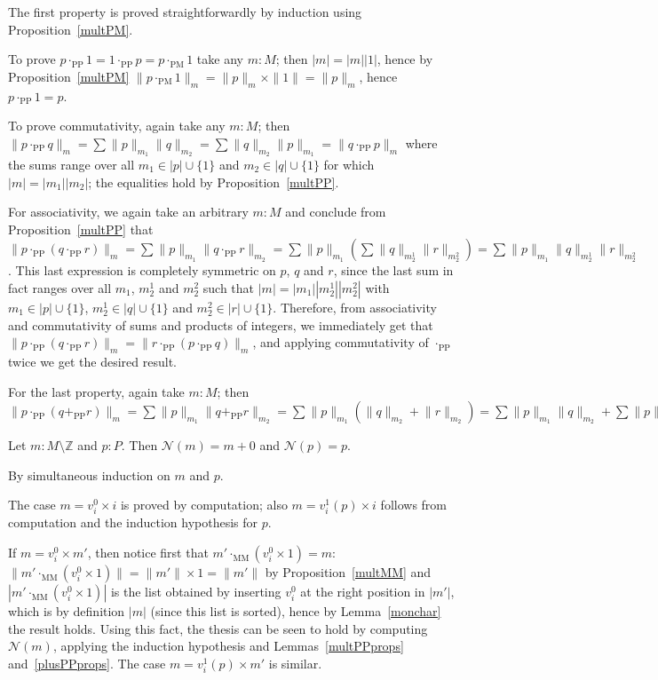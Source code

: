 \documentclass[numreferences]{kluwer}
\newcommand{\N}{\ensuremath{\mathcal{N}}}
\newcommand{\Z}{{\mathbb Z}}
\newcommand{\coeff}[2]{\ensuremath{\|#2\|_{#1}}}
\newcommand{\multMM}{\ensuremath{\cdot_{\mathrm{MM}}}}
\newcommand{\plusPP}{\ensuremath{+_{\mathrm{PP}}}}
\newcommand{\multPM}{\ensuremath{\cdot_{\mathrm{PM}}}}
\newcommand{\multPP}{\ensuremath{\cdot_{\mathrm{PP}}}}
\begin{document}
\begin{article}
\begin{pf}
The first property is proved straightforwardly by induction using
Proposition~\ref{multPM}.

To prove $p\multPP1=1\multPP p=p\multPM1$ take any $m:M$; then
$|m|=|m||1|$, hence by Proposition~\ref{multPM}
$\coeff m{p\multPM1}=\coeff mp\times\|1\|=\coeff mp$, hence $p\multPP1=p$.

To prove commutativity, again take any $m:M$; then
$\coeff m{p\multPP q}=%
\sum\coeff{m_1}p\coeff{m_2}q=%
\sum\coeff{m_2}q\coeff{m_1}p=%
\coeff m{q\multPP p}$
where the sums range over all $m_1\in|p|\cup\{1\}$ and $m_2\in|q|\cup\{1\}$
for which $|m|=|m_1||m_2|$; the equalities hold by Proposition~\ref{multPP}.

For associativity, we again take an arbitrary $m:M$ and conclude from
Proposition~\ref{multPP} that
$\coeff m{p\multPP(q\multPP r)}=%
\sum\coeff{m_1}p\coeff{m_2}{q\multPP r}=%
\sum\coeff{m_1}p\left(\sum\coeff{m_2^1}q\coeff{m_2^2}r\right)=%
\sum\coeff{m_1}p\coeff{m_2^1}q\coeff{m_2^2}r$.
This last expression is completely symmetric on $p$, $q$ and $r$, since the
last sum in fact ranges over all $m_1$, $m_2^1$ and $m_2^2$ such that
$|m|=|m_1||m_2^1||m_2^2|$ with $m_1\in|p|\cup\{1\}$, $m_2^1\in|q|\cup\{1\}$
and $m_2^2\in|r|\cup\{1\}$.
Therefore, from associativity and commutativity of sums and products of
integers, we immediately get that
$\coeff m{p\multPP(q\multPP r)}=\coeff m{r\multPP(p\multPP q)}$, and
applying commutativity of {\multPP} twice we get the desired result.

For the last property, again take $m:M$; then
$\coeff m{p\multPP(q\plusPP r)}=%
\sum\coeff{m_1}p\coeff{m_2}{q\plusPP r}=%
\sum\coeff{m_1}p(\coeff{m_2}q+\coeff{m_2}r)=%
\sum\coeff{m_1}p\coeff{m_2}q+\sum\coeff{m_1}p\coeff{m_2}r=%
\coeff m{(p\multPP q)\plusPP(p\multPP r)}$
\end{pf}

\begin{lemma}\label{NormRmon} Let $m:M\setminus\Z$ and $p:P$.
Then $\N(m)=m+0$ and $\N(p)=p$.
\end{lemma}
\begin{pf}
By simultaneous induction on $m$ and $p$.

The case $m=v^0_i\times i$ is proved by computation; also
$m=v^1_i(p)\times i$ follows from computation and the induction
hypothesis for $p$.

If $m=v^0_i\times m'$, then notice first that $m'\multMM(v^0_i\times 1)=m$:
$\|m'\multMM(v^0_i\times1)\|=\|m'\|\times1=\|m'\|$ by Proposition~\ref{multMM}
and $|m'\multMM(v^0_i\times 1)|$ is the list obtained by inserting $v^0_i$ at
the right position in $|m'|$, which is by definition $|m|$ (since this list is
sorted), hence by Lemma~\ref{monchar} the result holds.
Using this fact, the thesis can be seen to hold by computing $\N(m)$,
applying the induction hypothesis and Lemmas~\ref{multPPprops}
and~\ref{plusPPprops}.
The case $m=v^1_i(p)\times m'$ is similar.


\end{pf}
\end{article}
\end{document}
